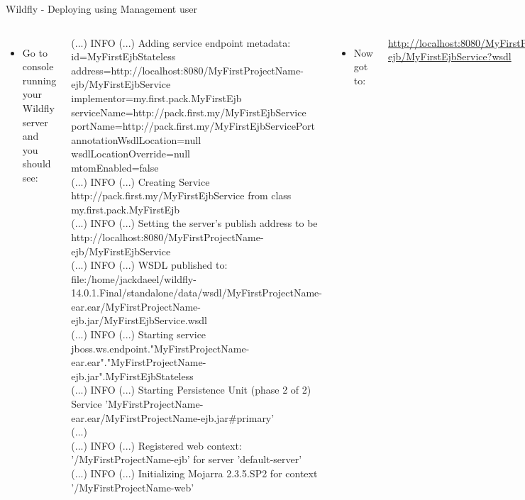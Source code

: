 \documentclass[aspectratio=1610,english]{beamer} %
\begin{document}
\begin{frame}{Wildfly - Deploying using Management user}
\begin{columns}
				\begin{itemize}
					\tiny
					\color{black}
					\item Go to console running your Wildfly server and you should see:	
				\end{itemize} 
				\fontsize{3}{4} \selectfont
				\raggedright{
				(...) INFO (...) Adding service endpoint metadata: id=MyFirstEjbStateless \\
address=http://localhost:8080/MyFirstProjectName-ejb/MyFirstEjbService \\
implementor=my.first.pack.MyFirstEjb \\
serviceName={http://pack.first.my/}MyFirstEjbService \\
portName={http://pack.first.my/}MyFirstEjbServicePort \\
annotationWsdlLocation=null \\
wsdlLocationOverride=null \\
mtomEnabled=false \\
				(...) INFO (...) Creating Service {http://pack.first.my/}MyFirstEjbService from class my.first.pack.MyFirstEjb \\
				(...) INFO (...) Setting the server's publish address to be http://localhost:8080/MyFirstProjectName-ejb/MyFirstEjbService \\
				(...) INFO (...) WSDL published to: file:/home/jackdaeel/wildfly-14.0.1.Final/standalone/data/wsdl/MyFirstProjectName-ear.ear/MyFirstProjectName-ejb.jar/MyFirstEjbService.wsdl \\				
				(...) INFO (...) Starting service jboss.ws.endpoint."MyFirstProjectName-ear.ear"."MyFirstProjectName-ejb.jar".MyFirstEjbStateless \\ 
				(...) INFO (...) Starting Persistence Unit (phase 2 of 2) Service 'MyFirstProjectName-ear.ear/MyFirstProjectName-ejb.jar\#primary' \\
				(...) \\
				(...) INFO (...) Registered web context: '/MyFirstProjectName-ejb' for server 'default-server' \\
				(...) INFO (...) Initializing Mojarra 2.3.5.SP2 for context '/MyFirstProjectName-web' \\
				}
				
				
				\begin{itemize}
					\tiny
					\color{black}
					\item Now got to:
				\end{itemize}
				\tiny 
				\url{http://localhost:8080/MyFirstProjectName-ejb/MyFirstEjbService?wsdl}
				

\end{columns}
\end{frame}
\end{document}
